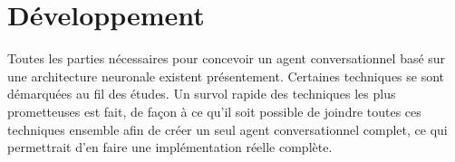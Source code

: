 \section{Développement}

Toutes les parties nécessaires pour concevoir un agent conversationnel basé sur une architecture neuronale existent présentement. Certaines techniques se sont démarquées au fil des études. Un survol rapide des techniques les plus prometteuses est fait, de façon à ce qu'il soit possible de joindre toutes ces techniques ensemble afin de créer un seul agent conversationnel complet, ce qui permettrait d'en faire une implémentation réelle complète.






